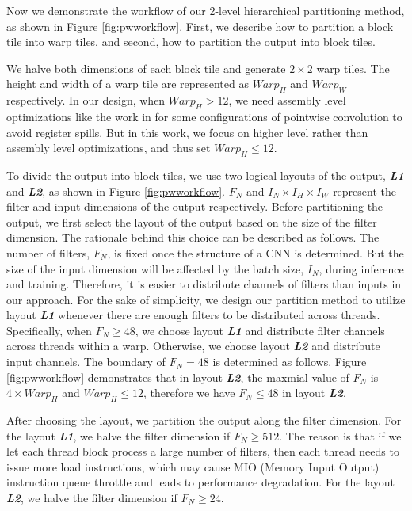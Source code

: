 Now we demonstrate the workflow of our 2-level hierarchical partitioning method, as shown in Figure \ref{fig:pwworkflow}.
First, we describe how to partition a block tile into warp tiles, and second, how to partition the output into block tiles.

We halve both dimensions of each block tile and generate $2 \times 2$ warp tiles. 
The height and width of a warp tile are represented as $Warp_H$ and $Warp_W$ respectively.
In our design, when $Warp_H > 12$, we need assembly level optimizations like the work in \cite{yan2020optimizing,yan2020demystifying} for some configurations of pointwise convolution to avoid register spills.
But in this work, we focus on higher level rather than assembly level optimizations, and thus set $Warp_H \leq 12$.

To divide the output into block tiles, we use two logical layouts of the output, \textbf{\emph{L1}} and \textbf{\emph{L2}}, as shown in Figure \ref{fig:pwworkflow}. 
$F_N$ and $I_N \times I_H \times I_W$ represent the filter and input dimensions of the output respectively.
Before partitioning the output, we first select the layout of the output based on the size of the filter dimension.
The rationale behind this choice can be described as follows. 
The number of filters, $F_N$, is fixed once the structure of a CNN is determined. 
But the size of the input dimension will be affected by the batch size, $I_N$, during inference and training.
Therefore, it is easier to distribute channels of filters than inputs in our approach.
For the sake of simplicity, we design our partition method to utilize layout \textbf{\emph{L1}} whenever there are enough filters to be distributed across threads.
Specifically, when $F_N \ge 48$, we choose layout \textbf{\emph{L1}} and distribute filter channels across threads within a warp. 
Otherwise, we choose layout \textbf{\emph{L2}} and distribute input channels.
The boundary of $F_N = 48$ is determined as follows.
Figure \ref{fig:pwworkflow} demonstrates that in layout \textbf{\emph{L2}}, the maxmial value of $F_N$ is $4 \times Warp_H$ and $Warp_H \leq 12$, therefore we have $F_N \leq 48$ in layout \textbf{\emph{L2}}.

After choosing the layout, we partition the output along the filter dimension.
For the layout \textbf{\emph{L1}}, we halve the filter dimension if $F_N \geq 512$. 
The reason is that if we let each thread block process a large number of filters, then each thread needs to issue more load instructions, which may cause MIO (Memory Input Output) instruction queue throttle and leads to performance degradation.  
For the layout \textbf{\emph{L2}}, we halve the filter dimension if $F_N \geq 24$.

